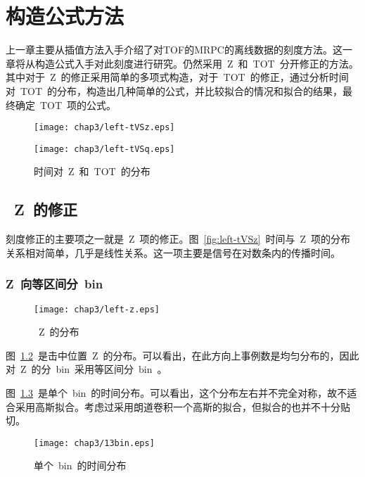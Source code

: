 \chapter{构造公式方法}
上一章主要从插值方法入手介绍了对TOF的MRPC的离线数据的刻度方法。这一章将从构造公式入手对此刻度进行研究。仍然采用~Z~和~TOT~分开修正的方法。其中对于~Z~的修正采用简单的多项式构造，对于~TOT~的修正，通过分析时间对~TOT~的分布，构造出几种简单的公式，并比较拟合的情况和拟合的结果，最终确定~TOT~项的公式。

\begin{figure}[!h]
\begin{minipage}[!h]{0.5\linewidth}
\texttt{[image: chap3/left-tVSz.eps]}
\label{fig:left-tVSz}
\end{minipage}%
\hfill
\begin{minipage}[!h]{0.5\linewidth}
\texttt{[image: chap3/left-tVSq.eps]}
\label{fig:left-tVSq}
\end{minipage}
\caption{时间对~Z~和~TOT~的分布}
\end{figure}

\section{~Z~的修正}
刻度修正的主要项之一就是~Z~项的修正。图~\ref{fig:left-tVSz}~时间与~Z~项的分布关系相对简单，几乎是线性关系。这一项主要是信号在对数条内的传播时间。
\subsection{Z~向等区间分~bin~}

\begin{figure}[htbp]
\centering
\texttt{[image: chap3/left-z.eps]}
\caption{~Z~的分布}
\label{fig:left-z}
\end{figure}

图~\ref{fig:left-z}~是击中位置~Z~的分布。可以看出，在此方向上事例数是均匀分布的，因此对~Z~的分~bin~采用等区间分~bin~。

图~\ref{fig:13bin}~是单个~bin~的时间分布。可以看出，这个分布左右并不完全对称，故不适合采用高斯拟合。考虑过采用朗道卷积一个高斯的拟合，但拟合的也并不十分贴切。

\begin{figure}[htbp]
\centering
\texttt{[image: chap3/13bin.eps]}
\caption{单个~bin~的时间分布}
\label{fig:13bin}
\end{figure}

